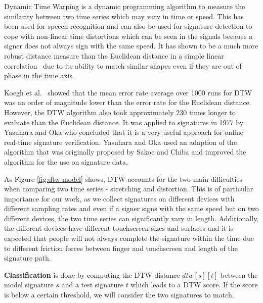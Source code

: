 \documentclass[a4paper, oneside]{csthesis}
\begin{document}
Dynamic Time Warping is a dynamic programming algorithm to measure the similarity between two time series which may vary in time or speed. This has been used for speech recognition and can also be used for signature detection to cope with  non-linear time distortions which can be seen in the signals because a signer does not always sign with the same speed. It has shown to be a much more robust distance measure than the Euclidean distance in a simple linear correlation~\cite{Keogh:2000:SUD:347090.347153, 1030918, 1227706} due to its ability to match similar shapes even if they are out of phase in the time axis.

Koegh et al.~\cite{Keogh:2002:EID:1287369.1287405} showed that the mean error rate average over 1000 runs for DTW was an order of magnitude lower than the error rate for the Euclidean distance. However, the DTW algorithm also took approximately 230 times longer to evaluate than the Euclidean distance.
It was applied to signatures in 1977 by Yasuhara and Oka \cite{yasuhara1977DTW} who concluded that it is a very useful approach for online real-time signature verification. Yasuhara and Oka used an adaption of the algorithm that was originally proposed by Sakoe and Chiba \cite{1163055} and improved the algorithm for the use on signature data.

As Figure \ref{fig:dtw-model} shows, DTW accounts for the two main difficulties when comparing two time series - stretching and distortion. This is of particular importance for our work, as we collect signatures on different devices with different sampling rates and even if a signer signs with the same speed but on two different devices, the two time series can significantly vary in length. Additionally, the different devices have different touchscreen sizes and surfaces and it is expected that people will not always complete the signature within the time due to different friction forces between finger and touchscreen and length of the signature path.



\textbf{Classification} is done by computing the DTW distance $dtw[s][t]$ between the model signature $s$ and a test signature $t$ which leads to a DTW score. If the score is below a certain threshold, we will consider the two signatures to match.
\end{document}
